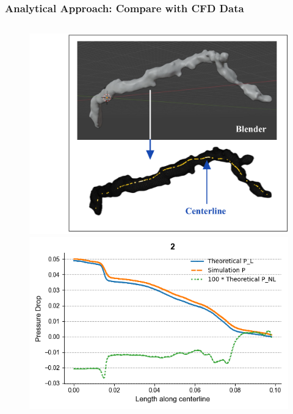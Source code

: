 \documentclass{beamer}
\begin{document}
\begin{frame}
    \fontsize{8pt}{10pt}\selectfont
    \frametitle{Analytical Approach: Compare with CFD Data }
    

    

    


    \begin{columns}
        \begin{column}{0.5\textwidth}

            \begin{figure}[H]
                \centering
                \includegraphics[width=\textwidth]{figures/Centerline.jpg}
                \includegraphics[width=\textwidth]{figures/Cline_2_NL.jpg}
            \end{figure}
        \end{column}


\end{columns}
\end{frame}
\end{document}
